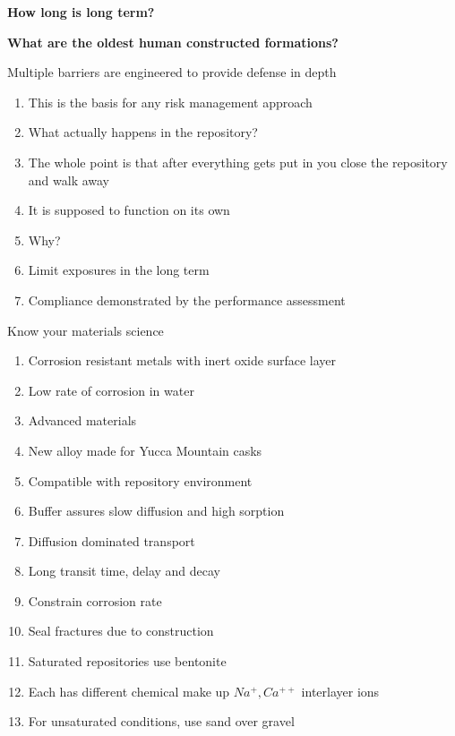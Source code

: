 \documentclass[aspectratio=1610,pdftex,dvipsnames,compress,xcolor={dvipsnames}]{beamer}
\begin{document}
\begin{frame}[plain]{}
    \centering\LARGE\textbf{How long is long term?}
\end{frame}


\begin{frame}[plain]{}
    \centering\LARGE\textbf{What are the oldest human constructed formations?}
\end{frame}


\addtocounter{framenumber}{-2} 
\begin{frame}{Multiple barriers are engineered to provide defense in depth}
    \begin{enumerate}[series=outerlist,topsep=0pt,itemsep=21pt,leftmargin=*,label=(\arabic*)]
        \item[]This is the basis for any risk management approach
        \item[]What actually happens in the repository?
        \item[]The whole point is that after everything gets put in you close the repository and walk away
        \item[]It is supposed to function on its own
        \item[]Why?
        \item[]Limit exposures in the long term
        \item[]Compliance demonstrated by the performance assessment
    \end{enumerate}
\end{frame}


\begin{frame}{Know your materials science}
    \begin{enumerate}[series=outerlist,topsep=0pt,itemsep=3pt,leftmargin=*,label=(\arabic*)]
        \item[]Corrosion resistant metals with inert oxide surface layer
        \item[]Low rate of corrosion in water
        \item[]Advanced materials
        \item[]New alloy made for Yucca Mountain casks
        \item[]Compatible with repository environment
        \item[]Buffer assures slow diffusion and high sorption
        \item[]Diffusion dominated transport
        \item[]Long transit time, delay and decay
        \item[]Constrain corrosion rate
        \item[]Seal fractures due to construction
        \item[]Saturated repositories use bentonite
        \item[]Each has different chemical make up $Na^+,Ca^{++}$ interlayer ions
        \item[]For unsaturated conditions, use sand over gravel
    \end{enumerate}
\end{frame}
\end{document}
